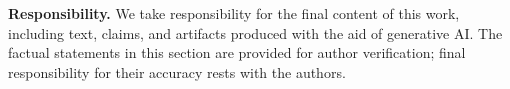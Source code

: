 \documentclass{article}
\begin{document}
\textbf{Responsibility.} We take responsibility for the final content of this
work, including text, claims, and artifacts produced with the aid of generative
AI. The factual statements in this section are provided for author verification;
final responsibility for their accuracy rests with the authors.




\appendix


\end{document}
